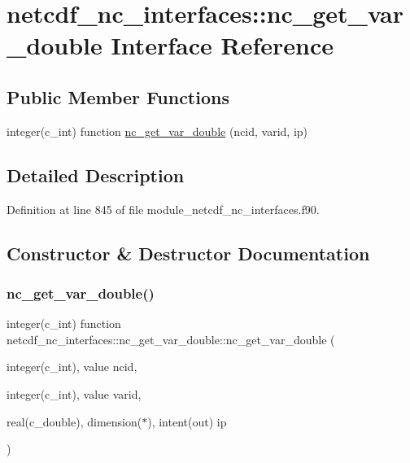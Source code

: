 \hypertarget{interfacenetcdf__nc__interfaces_1_1nc__get__var__double}{}\section{netcdf\+\_\+nc\+\_\+interfaces\+:\+:nc\+\_\+get\+\_\+var\+\_\+double Interface Reference}
\label{interfacenetcdf__nc__interfaces_1_1nc__get__var__double}
\subsection*{Public Member Functions}
\begin{DoxyCompactItemize}
\item 
integer(c\+\_\+int) function \hyperlink{interfacenetcdf__nc__interfaces_1_1nc__get__var__double_a7dc64dc672bf73cc1543e24599e3c872}{nc\+\_\+get\+\_\+var\+\_\+double} (ncid, varid, ip)
\end{DoxyCompactItemize}


\subsection{Detailed Description}


Definition at line 845 of file module\+\_\+netcdf\+\_\+nc\+\_\+interfaces.\+f90.



\subsection{Constructor \& Destructor Documentation}
\mbox{\label{interfacenetcdf__nc__interfaces_1_1nc__get__var__double_a7dc64dc672bf73cc1543e24599e3c872}} 
\subsubsection{\texorpdfstring{nc\+\_\+get\+\_\+var\+\_\+double()}{nc\_get\_var\_double()}}
{\footnotesize\ttfamily integer(c\+\_\+int) function netcdf\+\_\+nc\+\_\+interfaces\+::nc\+\_\+get\+\_\+var\+\_\+double\+::nc\+\_\+get\+\_\+var\+\_\+double (\begin{DoxyParamCaption}\item[{integer(c\+\_\+int), value}]{ncid,  }\item[{integer(c\+\_\+int), value}]{varid,  }\item[{real(c\+\_\+double), dimension($\ast$), intent(out)}]{ip }\end{DoxyParamCaption})}



